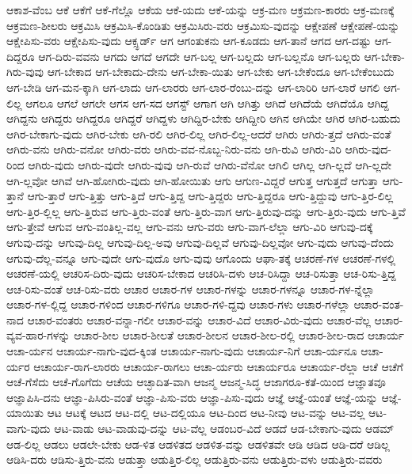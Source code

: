 {ಆಕಾಶ-ವೆಂಬ
ಆಕೆ
ಆಕೆಗೆ
ಆಕೆ-ಗೆಲ್ಲೊ
ಆಕೆಯ
ಆಕೆ-ಯದು
ಆಕೆ-ಯನ್ನು
ಆಕ್ರ-ಮಣ
ಆಕ್ರಮಣ-ಕಾರರು
ಆಕ್ರ-ಮಣಕ್ಕೆ
ಆಕ್ರಮಣ-ಶೀಲರು
ಆಕ್ರಮಿಸಿ
ಆಕ್ರಮಿಸಿ-ಕೊಂಡಿತು
ಆಕ್ರಮಿಸಿರು-ವರು
ಆಕ್ರಮಿಸು-ವುದನ್ನು
ಆಕ್ಷೇಪಣೆ
ಆಕ್ಷೇಪಣೆ-ಯನ್ನು
ಆಕ್ಷೇಪಿಸು-ವರು
ಆಕ್ಷೇಪಿಸು-ವುದು
ಆಕ್ಸ್ಫರ್ಡ್
ಆಗ
ಆಗಂತುಕನು
ಆಗ-ಕೂಡದು
ಆಗ-ತಾನೆ
ಆಗದ
ಆಗ-ದಷ್ಟು
ಆಗ-ದಿದ್ದರೂ
ಆಗ-ದಿರು-ವವನು
ಆಗದು
ಆಗದೆ
ಆಗದೇ
ಆಗ-ಬಲ್ಲ
ಆಗ-ಬಲ್ಲದು
ಆಗ-ಬಲ್ಲನೊ
ಆಗ-ಬಲ್ಲರು
ಆಗ-ಬೇಕಾ-ಗಿರು-ವುವು
ಆಗ-ಬೇಕಾದ
ಆಗ-ಬೇಕಾದು-ದೇನು
ಆಗ-ಬೇಕಾ-ಯಿತು
ಆಗ-ಬೇಕು
ಆಗ-ಬೇಕೆಂದೂ
ಆಗ-ಬೇಕೆಂಬುದು
ಆಗ-ಬೇಡಿ
ಆಗ-ಮನ-ಕ್ಕಾಗಿ
ಆಗ-ಲಾದು
ಆಗ-ಲಾರರು
ಆಗ-ಲಾರ-ರೆಂಬು-ದನ್ನು
ಆಗ-ಲಾರಿರಿ
ಆಗ-ಲಾರೆ
ಆಗಲಿ
ಆಗ-ಲಿಲ್ಲ
ಆಗಲೂ
ಆಗಲೆ
ಆಗಲೇ
ಆಗಸ
ಆಗ-ಸದ
ಆಗಸ್ಟ್
ಆಗಾಗ
ಆಗಿ
ಆಗಿತ್ತು
ಆಗಿದೆ
ಆಗಿದೆಯೆ
ಆಗಿದೆಯೊ
ಆಗಿದ್ದ
ಆಗಿದ್ದನು
ಆಗಿದ್ದರು
ಆಗಿದ್ದರೂ
ಆಗಿದ್ದರೆ
ಆಗಿದ್ದಳು
ಆಗಿದ್ದಿರ-ಬೇಕು
ಆಗಿದ್ದೀರಿ
ಆಗಿನ
ಆಗಿಯೇ
ಆಗಿರ
ಆಗಿರ-ಬಹುದು
ಆಗಿರ-ಬೇಕಾಗು-ವುದು
ಆಗಿರ-ಬೇಕು
ಆಗಿ-ರಲಿ
ಆಗಿರ-ಲಿಲ್ಲ
ಆಗಿರ-ಲಿಲ್ಲ-ಆದರೆ
ಆಗಿರು
ಆಗಿರು-ತ್ತದೆ
ಆಗಿರು-ವಂತೆ
ಆಗಿರು-ವನು
ಆಗಿರು-ವನೋ
ಆಗಿರು-ವರು
ಆಗಿರು-ವವ-ನೊಬ್ಬ-ನಿರು-ವನು
ಆಗಿ-ರುವಿ
ಆಗಿರು-ವಿರಿ
ಆಗಿರು-ವುದ-ರಿಂದ
ಆಗಿರು-ವುದು
ಆಗಿರು-ವುದೇ
ಆಗಿರು-ವುವು
ಆಗಿ-ರುವೆ
ಆಗಿರು-ವೆನೋ
ಆಗಿಲಿ
ಆಗಿಲ್ಲ
ಆಗಿ-ಲ್ಲದೆ
ಆಗಿ-ಲ್ಲದೇ
ಆಗಿ-ಲ್ಲವೋ
ಆಗಿವೆ
ಆಗಿ-ಹೋಗಿರು-ವುದು
ಆಗಿ-ಹೋಯಿತು
ಆಗು
ಆಗುಣ-ವಿದ್ದರೆ
ಆಗುತ್ತ
ಆಗುತ್ತದೆ
ಆಗುತ್ತಾ
ಆಗು-ತ್ತಾನೆ
ಆಗು-ತ್ತಾರೆ
ಆಗು-ತ್ತಿತ್ತು
ಆಗು-ತ್ತಿದೆ
ಆಗು-ತ್ತಿದ್ದ
ಆಗು-ತ್ತಿದ್ದರು
ಆಗು-ತ್ತಿದ್ದರೂ
ಆಗು-ತ್ತಿದ್ದುವು
ಆಗು-ತ್ತಿರ-ಲಿಲ್ಲ
ಆಗು-ತ್ತಿರ-ಲ್ಲಿಲ್ಲ
ಆಗು-ತ್ತಿರುವ
ಆಗು-ತ್ತಿರು-ವಂತೆ
ಆಗು-ತ್ತಿರು-ವಾಗ
ಆಗು-ತ್ತಿರುವು-ದನ್ನು
ಆಗು-ತ್ತಿರು-ವುದು
ಆಗು-ತ್ತಿವೆ
ಆಗು-ತ್ತೇವೆ
ಆಗುವ
ಆಗು-ವಂತಿಲ್ಲ-ವಲ್ಲ
ಆಗು-ವನು
ಆಗು-ವರು
ಆಗು-ವಾಗ-ಲೆಲ್ಲಾ
ಆಗು-ವಿರಿ
ಆಗುವು-ದಕ್ಕೆ
ಆಗುವು-ದನ್ನು
ಆಗುವು-ದಿಲ್ಲ
ಆಗುವು-ದಿಲ್ಲ-ಅವು
ಆಗುವು-ದಿಲ್ಲವೆ
ಆಗುವು-ದಿಲ್ಲವೋ
ಆಗು-ವುದು
ಆಗುವು-ದೆಂದು
ಆಗುವು-ದೆಲ್ಲ-ವನ್ನೂ
ಆಗು-ವುದೇ
ಆಗು-ವುದೊ
ಆಗು-ವುವು
ಆಗೊಂದು
ಆಘಾ-ತಕ್ಕೆ
ಆಚರಣೆ-ಗಳ
ಆಚರಣೆ-ಗಳಲ್ಲಿ
ಆಚರಣೆ-ಯಲ್ಲಿ
ಆಚರಿಸ-ದಿರು-ವುದು
ಆಚರಿಸ-ಬೇಕಾದ
ಆಚರಿಸಿ-ದಳು
ಆಚ-ರಿಸಿದ್ದಾ
ಆಚ-ರಿಸುತ್ತಾ
ಆಚ-ರಿಸು-ತ್ತಿದ್ದ
ಆಚ-ರಿಸು-ವಂತೆ
ಆಚ-ರಿಸು-ವರು
ಆಚಾರ
ಆಚಾರ-ಗಳ
ಆಚಾರ-ಗಳನ್ನು
ಆಚಾರ-ಗಳನ್ನೂ
ಆಚಾರ-ಗಳ-ನ್ನೆಲ್ಲಾ
ಆಚಾರ-ಗಳ-ಲ್ಲಿದ್ದ
ಆಚಾರ-ಗಳಿಂದ
ಆಚಾರ-ಗಳಿಗೂ
ಆಚಾರ-ಗಳಿ-ದ್ದವು
ಆಚಾರ-ಗಳು
ಆಚಾರ-ಗಳೆಲ್ಲಾ
ಆಚಾರ-ವಂತ-ನಾದ
ಆಚಾರ-ವಂತರು
ಆಚಾರ-ವನ್ನಾ-ಗಲೀ
ಆಚಾರ-ವನ್ನು
ಆಚಾರ-ವಿದೆ
ಆಚಾರ-ವಿರು-ವುದು
ಆಚಾರ-ವೆಲ್ಲ
ಆಚಾರ-ವ್ಯವ-ಹಾರ-ಗಳನ್ನು
ಆಚಾರ-ಶೀಲ
ಆಚಾರ-ಶೀಲತೆ
ಆಚಾರ-ಶೀಲನ
ಆಚಾರ-ಶೀಲ-ರಲ್ಲಿ
ಆಚಾರ-ಶೀಲ-ರಾದ
ಆಚಾರ್ಯ
ಆಚಾ-ರ್ಯನ
ಆಚಾರ್ಯ-ನಾಗು-ವುದ-ಕ್ಕಿಂತ
ಆಚಾರ್ಯ-ನಾಗು-ವುದು
ಆಚಾರ್ಯ-ನಿಗೆ
ಆಚಾ-ರ್ಯನೂ
ಆಚಾ-ರ್ಯರ
ಆಚಾರ್ಯ-ರಾಗ-ಲಾರರು
ಆಚಾರ್ಯ-ರಾಗಲು
ಆಚಾ-ರ್ಯರು
ಆಚಾರ್ಯರೂ
ಆಚಾರ್ಯ-ರೆಲ್ಲಾ
ಆಚೆ
ಆಚೆಗೆ
ಆಚೆ-ಗೆಸೆದು
ಆಚೆ-ಗೊಗೆದು
ಆಚೆಯ
ಆಚ್ಛಾದಿತ-ವಾಗಿ
ಆಜನ್ಮ
ಆಜನ್ಮ-ಸಿದ್ಧ
ಆಜಾಗರೂ-ಕತೆ-ಯಿಂದ
ಆಜ್ಞಾತವೂ
ಆಜ್ಞಾಪಿಸಿ-ದನು
ಆಜ್ಞಾ-ಪಿಸಿರು-ವಂತೆ
ಆಜ್ಞಾ-ಪಿಸು-ವರು
ಆಜ್ಞಾ-ಪಿಸು-ವುದು
ಆಜ್ಞೆ
ಆಜ್ಞೆ-ಯಂತೆ
ಆಜ್ಞೆ-ಯನ್ನು
ಆಜ್ಞೆ-ಯಾಯಿತು
ಆಟ
ಆಟಕ್ಕೆ
ಆಟದ
ಆಟ-ದಲ್ಲಿ
ಆಟ-ದಲ್ಲಿಯೂ
ಆಟ-ದಿಂದ
ಆಟ-ನೀವು
ಆಟ-ವನ್ನು
ಆಟ-ವಲ್ಲ
ಆಟ-ವಾಗು-ವುದು
ಆಟ-ವಾಡು
ಆಟ-ವಾಡುವು-ದನ್ನು
ಆಟ-ವೆಲ್ಲ
ಆಡಂಬರ-ವಿದೆ
ಆಡದೆ
ಆಡ-ಬೇಕಾಗು-ವುದು
ಆಡಮ್
ಆಡ-ಲಿಲ್ಲ
ಆಡಲು
ಆಡಲೇ-ಬೇಕು
ಆಡ-ಳಿತ
ಆಡಳಿತದ
ಆಡಳಿತ-ವನ್ನು
ಆಡಳಿತವೇ
ಆಡಿ
ಆಡಿದ
ಆಡಿ-ದರೆ
ಆಡಿಲ್ಲ
ಆಡಿಸಿ-ದರು
ಆಡಿಸು-ತ್ತಿರು-ವನು
ಆಡುತ್ತಾ
ಆಡುತ್ತಿರ-ಲಿಲ್ಲ
ಆಡುತ್ತಿರು-ವನು
ಆಡುತ್ತಿರು-ವಳು
ಆಡುತ್ತಿರು-ವವರು
}

